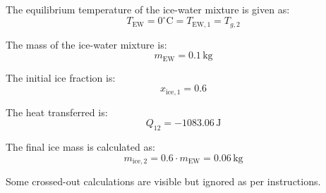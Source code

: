 The equilibrium temperature of the ice-water mixture is given as:  
\[
T_{\text{EW}} = 0^\circ\text{C} = T_{\text{EW},1} = T_{g,2}
\]  

The mass of the ice-water mixture is:  
\[
m_{\text{EW}} = 0.1 \, \text{kg}
\]  

The initial ice fraction is:  
\[
x_{\text{ice},1} = 0.6
\]  

The heat transferred is:  
\[
Q_{12} = -1083.06 \, \text{J}
\]  

The final ice mass is calculated as:  
\[
m_{\text{ice},2} = 0.6 \cdot m_{\text{EW}} = 0.06 \, \text{kg}
\]  

Some crossed-out calculations are visible but ignored as per instructions.